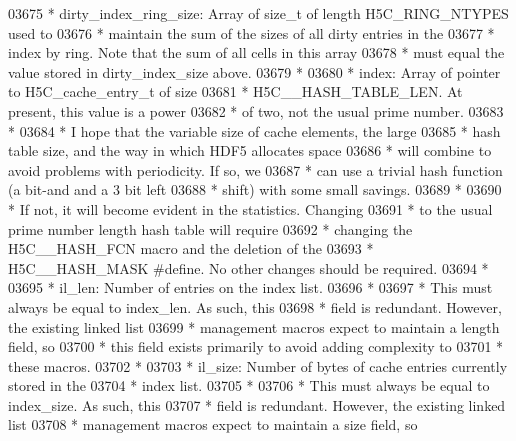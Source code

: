 \begin{DoxyCode}
03675 \textcolor{comment}{ * dirty\_index\_ring\_size: Array of size\_t of length H5C\_RING\_NTYPES used to}
03676 \textcolor{comment}{ *      maintain the sum of the sizes of all dirty entries in the }
03677 \textcolor{comment}{ *      index by ring.  Note that the sum of all cells in this array }
03678 \textcolor{comment}{ *      must equal the value stored in dirty\_index\_size above.}
03679 \textcolor{comment}{ *}
03680 \textcolor{comment}{ * index:   Array of pointer to H5C\_cache\_entry\_t of size}
03681 \textcolor{comment}{ *      H5C\_\_HASH\_TABLE\_LEN.  At present, this value is a power}
03682 \textcolor{comment}{ *      of two, not the usual prime number.}
03683 \textcolor{comment}{ *}
03684 \textcolor{comment}{ *      I hope that the variable size of cache elements, the large}
03685 \textcolor{comment}{ *      hash table size, and the way in which HDF5 allocates space}
03686 \textcolor{comment}{ *      will combine to avoid problems with periodicity.  If so, we}
03687 \textcolor{comment}{ *      can use a trivial hash function (a bit-and and a 3 bit left}
03688 \textcolor{comment}{ *      shift) with some small savings.}
03689 \textcolor{comment}{ *}
03690 \textcolor{comment}{ *      If not, it will become evident in the statistics. Changing}
03691 \textcolor{comment}{ *      to the usual prime number length hash table will require}
03692 \textcolor{comment}{ *      changing the H5C\_\_HASH\_FCN macro and the deletion of the}
03693 \textcolor{comment}{ *      H5C\_\_HASH\_MASK #define.  No other changes should be required.}
03694 \textcolor{comment}{ *}
03695 \textcolor{comment}{ * il\_len:  Number of entries on the index list.  }
03696 \textcolor{comment}{ *}
03697 \textcolor{comment}{ *      This must always be equal to index\_len.  As such, this }
03698 \textcolor{comment}{ *      field is redundant.  However, the existing linked list }
03699 \textcolor{comment}{ *      management macros expect to maintain a length field, so }
03700 \textcolor{comment}{ *      this field exists primarily to avoid adding complexity to}
03701 \textcolor{comment}{ *      these macros.}
03702 \textcolor{comment}{ *}
03703 \textcolor{comment}{ * il\_size:     Number of bytes of cache entries currently stored in the}
03704 \textcolor{comment}{ *      index list.}
03705 \textcolor{comment}{ *}
03706 \textcolor{comment}{ *      This must always be equal to index\_size.  As such, this }
03707 \textcolor{comment}{ *      field is redundant.  However, the existing linked list }
03708 \textcolor{comment}{ *      management macros expect to maintain a size field, so }

\end{DoxyCode}
